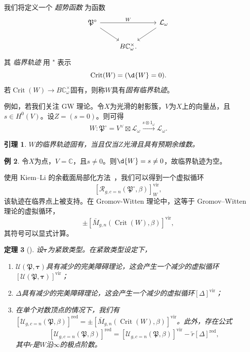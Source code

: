 \documentclass{amsart}
\newtheorem{thm}{定理}[section]
\newtheorem{lem}[thm]{引理}
\theoremstyle{definition}
\newtheorem{exm}[thm]{例}
\theoremstyle{remark}
\theoremstyle{plain}
\theoremstyle{definition}
\theoremstyle{remark}
\newcommand{\C}{\mathbb{C}}
\newcommand{\mc}[1]{\mathcal{#1}}
\newcommand{\mf}[1]{\mathfrak{#1}}
\newcommand{\mr}[1]{\mathrm{#1}}
\newcommand{\on}[1]{\operatorname{#1}}
\newcommand{\1}{\mathbf{1}}
\newcommand{\2}{\mathbf{2}}
\newcommand{\3}{\mathbf{3}}
\newcommand{\vir}{\mr{vir}}
\begin{document}
我们将定义一个 \textit{超势函数} 为函数
\begin{equation*}
\begin{tikzcd}
    \mf{P}^{\circ} \ar{rr}{W} \ar{dr} && \mc{L}_{\omega} \ar{dl} \\
    & B \C_{\omega}^{\times}.
\end{tikzcd}
\end{equation*}
其 \textit{临界轨迹} 用 " 表示
\[ \on{Crit}(W) = (\d{W} = 0). \]
若\(\on{Crit}(W) \to B\C_{\omega}^{\times}\)固有，则称\(W\)具有\textit{固有临界轨迹}。

例如，若我们关注 GW 理论。令\(X\)为光滑的射影簇，\(V\)为\(X\)上的向量丛，且\(s \in H^0(V)\)。设\(Z = (s = 0)\)。则可得
\[ W \colon \mf{P}^{\circ} = V^{\vee} \boxtimes \mc{L}_{\omega} \xrightarrow{s \otimes 1_{\omega}} \mc{L}_{\omega}. \]

\begin{lem}
\(W\)的临界轨迹固有，当且仅当\(Z\)光滑且具有预期余维数。
\end{lem}

\begin{exm}
令\(X\)为点，\(V = \C\)，且\(s \neq 0\)。则\(\d{W} = s \neq 0\)，故临界轨迹为空。
\end{exm}

使用 Kiem--Li 的余截面局部化方法~\cite{KiemLi2013}，我们可以得到一个虚拟循环
\[ [\mc{R}_{g, c=n}(\mf{P}^{\circ}, \beta)]_W^{\vir}, \]
该轨迹在临界点上被支持。在 Gromov-Witten 理论中，这等于 Gromov--Witten 理论的虚拟循环，
\[ \pm [\bar{M}_{g,n}(\on{Crit}(W), \beta)]^{\vir}, \]
其符号可以显式计算。

\begin{thm}[{\cite{CJR2021,CJW2021}}]
设\(\bm{\tau}\)为紧致类型。在紧致类型设定下，
    \begin{enumerate}
        \item \(\mc{U}(\mf{P}, \bm{\tau})\)具有减少的完美障碍理论，这会产生一个减少的虚拟循环\([\mc{U}(\mf{P}, \bm{\tau})]^{\vir}\)；
        \item \(\Delta\)具有减少的完美障碍理论，这会产生一个减少的虚拟循环\([\Delta]^{\vir}\)；
        \item 在单个对数顶点的情况下，我们有\([\mc{U}_{g, c=n}(\mf{P}, \beta)]^{\on{red}} = \pm [\bar{M}_{g,n}(\on{Crit}(W), \beta)]^{\vir}\)。此外，存在公式
            \[ [\mc{U}_{g, c=n}(\mf{P}, \beta)]^{\on{red}} = [\mc{U}_{g, c=n}(\mf{P}, \beta)]^{\vir} - \tilde{r} [\Delta]^{\on{red}}, \]
            其中\(\tilde{r}\)是\(W\)沿\(\infty\)的极点阶数。
    \end{enumerate}
\end{thm}
\end{document}
